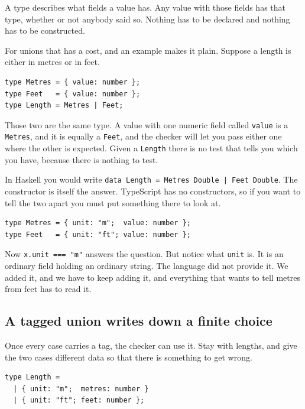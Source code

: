 \documentclass[11pt,a4paper]{article}
\begin{document}
\begin{sectionbox}
A type describes what fields a value has. Any value with those fields has that type, whether or
not anybody said so. Nothing has to be declared and nothing has to be constructed.
\end{sectionbox}

For unions that has a cost, and an example makes it plain. Suppose a length is either in metres
or in feet.

\begin{lstlisting}[language=TS]
type Metres = { value: number };
type Feet   = { value: number };
type Length = Metres | Feet;
\end{lstlisting}

Those two are the same type. A value with one numeric field called \texttt{value} is a
\texttt{Metres}, and it is equally a \texttt{Feet}, and the checker will let you pass either one
where the other is expected. Given a \texttt{Length} there is no test that tells you which you
have, because there is nothing to test.

In Haskell you would write \texttt{data Length = Metres Double | Feet Double}. The constructor is
itself the answer. TypeScript has no constructors, so if you want to tell the two apart you must
put something there to look at.

\begin{lstlisting}[language=TS]
type Metres = { unit: "m";  value: number };
type Feet   = { unit: "ft"; value: number };
\end{lstlisting}

Now \texttt{x.unit === "m"} answers the question. But notice what \texttt{unit} is. It is an
ordinary field holding an ordinary string. The language did not provide it. We added it, and we
have to keep adding it, and everything that wants to tell metres from feet has to read it.

\subsection{A tagged union writes down a finite choice}

Once every case carries a tag, the checker can use it. Stay with lengths, and give the two cases
different data so that there is something to get wrong.

\begin{lstlisting}[language=TS]
type Length =
  | { unit: "m";  metres: number }
  | { unit: "ft"; feet: number };
\end{lstlisting}
\end{document}
